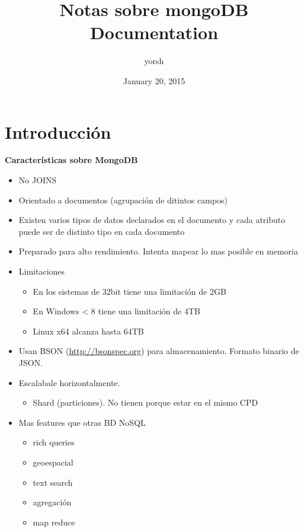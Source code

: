 \documentclass[a4paper,10pt,english]{sphinxmanual}
\title{Notas sobre mongoDB Documentation}
\date{January 20, 2015}
\author{yorsh}
\begin{document}
\maketitle
\tableofcontents
{}\label{index::doc}



\chapter{Introducción}
\label{contents/intro:indice}\label{contents/intro::doc}\label{contents/intro:introduccion}
\textbf{Características sobre MongoDB}
\begin{itemize}
\item {} 
No JOINS

\item {} 
Orientado a documentos (agrupación de ditintos campos)

\item {} 
Existen varios tipos de datos declarados en el documento y cada atributo puede ser de distinto tipo en cada documento

\item {} 
Preparado para alto rendimiento. Intenta mapear lo mas posible en memoria

\item {} 
Limitaciones
\begin{itemize}
\item {} 
En los sistemas de 32bit tiene una limitación de 2GB

\item {} 
En Windows \textless{} 8 tiene una limitación de 4TB

\item {} 
Linux x64 alcanza hasta 64TB

\end{itemize}

\item {} 
Usan BSON (\href{http://bsonspec.org}{http://bsonspec.org}) para almacenamiento. Formato binario de JSON.

\item {} 
Escalabale horizontalmente.
\begin{itemize}
\item {} 
Shard (particiones). No tienen porque estar en el mismo CPD

\end{itemize}

\item {} 
Mas features que otras BD NoSQL
\begin{itemize}
\item {} 
rich queries

\item {} 
geoespacial

\item {} 
text search

\item {} 
agregación

\item {} 
map reduce

\end{itemize}

\end{itemize}
\end{document}

